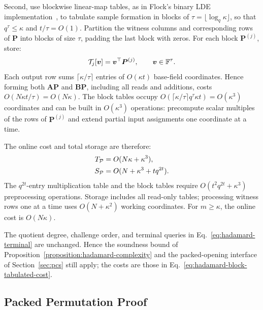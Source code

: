 Second, use blockwise linear-map tables, as in Flock's binary
LDE implementation~\cite[Section~4.2]{iacr/BunzRW26}, to tabulate
sample formation in blocks of
\(\tau=\lfloor\log_q\kappa\rfloor\), so that
\(q^\tau\leq\kappa\) and \(t/\tau=O(1)\).
Partition the witness columns and corresponding rows of \(\bm P\)
into blocks of size \(\tau\), padding the last block with zeros.
For each block \(\bm P^{(j)}\), store:
\begin{equation}
    \mathcal T_j[\bm v]=\bm v^\top\bm P^{(j)},
    \qquad \bm v\in{\mathbb{F}}^\tau.
\label{eq:hadamard-block-table}
\end{equation}
Each output row sums \(\lceil\kappa/\tau\rceil\) entries of
\(O(\kappa t)\) base-field coordinates. Hence forming both
\(\bm A\bm P\) and \(\bm B\bm P\), including all reads and
additions, costs \(O(N\kappa t/\tau)=O(N\kappa)\).
The block tables occupy
\(O(\lceil\kappa/\tau\rceil q^\tau\kappa t)=O(\kappa^3)\)
coordinates and can be built in \(O(\kappa^3)\) operations:
precompute scalar multiples of the rows of \(\bm P^{(j)}\)
and extend partial input assignments one coordinate at a time.

The online cost and total storage are therefore:
\begin{equation}
\begin{aligned}
    T_{\mathcal{P}}&=O(N\kappa+\kappa^3),\\
    S_{\mathcal{P}}&=O(N+\kappa^3+tq^{2t}).
\end{aligned}
\label{eq:hadamard-block-tabulated-cost}
\end{equation}
The \(q^{2t}\)-entry multiplication table and the block tables
require \(O(t^2q^{2t}+\kappa^3)\) preprocessing operations.
Storage includes all read-only tables; processing witness rows
one at a time uses \(O(N+\kappa^2)\) working coordinates.
For \(m\geq\kappa\), the online cost is \(O(N\kappa)\).

The quotient degree, challenge order, and terminal queries in
Eq.~\eqref{eq:hadamard-terminal} are unchanged. Hence the
soundness bound of Proposition~\ref{proposition:hadamard-complexity}
and the packed-opening interface of Section~\ref{sec:pcs} still
apply; the costs are those in
Eq.~\eqref{eq:hadamard-block-tabulated-cost}.

\subsection{Packed Permutation Proof}
\label{sec:permutation}

